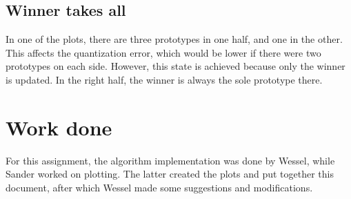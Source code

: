 \documentclass[10pt,a4paper]{article}
\begin{document}
\subsection{Winner takes all}
In one of the plots, there are three prototypes in one half, and one in the other. This affects the quantization error, which would be lower if there were two prototypes on each side. However, this state is achieved because only the winner is updated. In the right half, the winner is always the sole prototype there.

\section{Work done}
For this assignment, the algorithm implementation was done by Wessel, while Sander worked on plotting. The latter created the plots and put together this document, after which Wessel made some suggestions and modifications.
\end{document}
